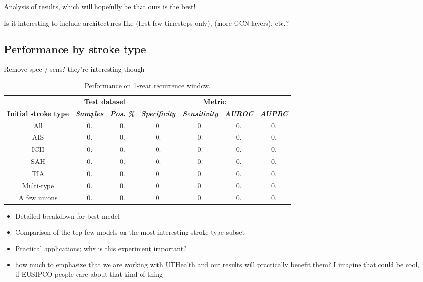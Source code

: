 \documentclass[conference]{IEEEtran}
\begin{document}
Analysis of results, which will hopefully be that ours is the best!

{\color{red} Is it interesting to include architectures like (first few timesteps only), (more GCN layers), etc.?}

\subsection{Performance by stroke type}

Remove spec / sens? they're interesting though
\begin{table}[htbp]
    \caption{Performance on 1-year recurrence window.}
    \begin{center}
    \begin{tabular}{|c|c|c|c|c|c|c|}
    \hline
    &\multicolumn{2}{|c|}{\textbf{Test dataset}}&\multicolumn{4}{|c|}{\textbf{Metric}} \\
    \cline{2-7} 
    \textbf{Initial stroke type} & \textbf{\textit{Samples}}& \textbf{\textit{Pos. \%}}& \textbf{\textit{Specificity}}& \textbf{\textit{Sensitivity}}& \textbf{\textit{AUROC}} &\textbf{\textit{AUPRC}}\\
    \hline
    All& 0. & 0. & 0. & 0. & 0. & 0. \\
    \hline
    AIS& 0. & 0. & 0. & 0. & 0. & 0. \\
    \hline
    ICH& 0. & 0. & 0. & 0. & 0. & 0. \\
    \hline
    SAH& 0. & 0. & 0. & 0. & 0. & 0. \\
    \hline
    TIA& 0. & 0. & 0. & 0. & 0. & 0. \\
    \hline
    Multi-type& 0. & 0. & 0. & 0. & 0. & 0. \\
    \hline
    A few unions& 0. & 0. & 0. & 0. & 0. & 0. \\
    \hline
    \end{tabular}
    \label{tab1}
    \end{center}
    \end{table}


\begin{itemize}
    \item Detailed breakdown for best model
    \item Comparison of the top few models on the most interesting stroke type subset
    \item Practical applications; why is this experiment important?
    \item {\color{red} how much to emphasize that we are working with UTHealth and our results will practically benefit them? I imagine that could be cool, if EUSIPCO people care about that kind of thing}
\end{itemize}
\end{document}
